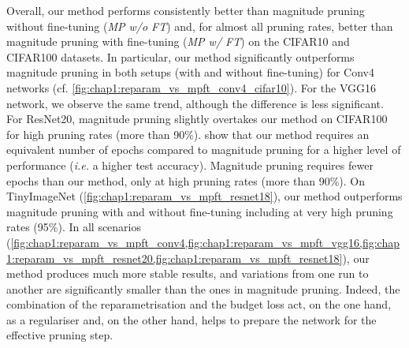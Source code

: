 Overall, our method performs consistently better than magnitude pruning without
fine-tuning (\emph{MP w/o FT}) and, for almost all pruning rates, better than
magnitude pruning with fine-tuning (\emph{MP w/ FT}) on the CIFAR10 and CIFAR100
datasets. In particular, our method significantly outperforms magnitude pruning
in both setups (with and without fine-tuning) for Conv4 networks (cf.
\cref{fig:chap1:reparam_vs_mpft_conv4_cifar10}). For the VGG16 network, we
observe the same trend, although the difference is less significant. For
ResNet20, magnitude pruning slightly overtakes our method on CIFAR100 for
high pruning rates (more than 90\%).
show that our method requires an equivalent number of epochs compared to
magnitude pruning for a higher level of performance (\textit{i.e.} a higher test
accuracy). Magnitude pruning requires fewer epochs than our method, only at high
pruning rates (more than 90\%). On TinyImageNet
(\cref{fig:chap1:reparam_vs_mpft_resnet18}), our method outperforms magnitude
pruning with and without fine-tuning including at very high pruning rates
(95\%). In all scenarios
(\cref{fig:chap1:reparam_vs_mpft_conv4,fig:chap1:reparam_vs_mpft_vgg16,fig:chap1:reparam_vs_mpft_resnet20,fig:chap1:reparam_vs_mpft_resnet18}),
our method produces much more stable results, and variations from one run to
another are significantly smaller than the ones in magnitude pruning. Indeed,
the combination of the reparametrisation and the budget loss act, on the one
hand, as a regulariser and, on the other hand, helps to prepare the network for
the effective pruning step.\\

